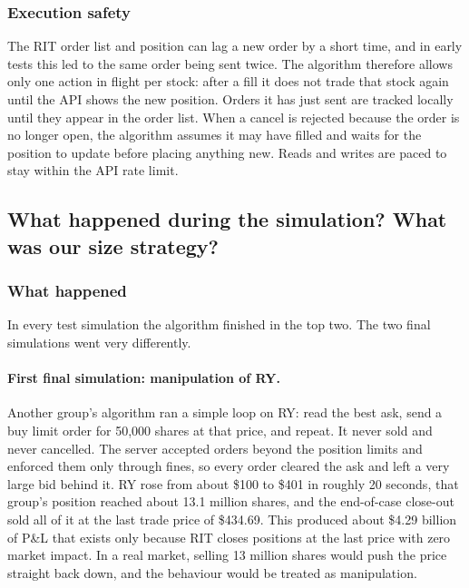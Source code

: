 \documentclass{article}
\begin{document}
\subsubsection*{Execution safety}

The RIT order list and position can lag a new order by a short time, and in early tests this led to the same order being sent twice. The algorithm therefore allows only one action in flight per stock: after a fill it does not trade that stock again until the API shows the new position. Orders it has just sent are tracked locally until they appear in the order list. When a cancel is rejected because the order is no longer open, the algorithm assumes it may have filled and waits for the position to update before placing anything new. Reads and writes are paced to stay within the API rate limit.

\subsection{What happened during the simulation? What was our size strategy?}

\subsubsection*{What happened}

In every test simulation the algorithm finished in the top two. The two final simulations went very differently.

\paragraph{First final simulation: manipulation of RY.}
Another group's algorithm ran a simple loop on RY: read the best ask, send a buy limit order for 50{,}000 shares at that price, and repeat. It never sold and never cancelled. The server accepted orders beyond the position limits and enforced them only through fines, so every order cleared the ask and left a very large bid behind it. RY rose from about \$100 to \$401 in roughly 20 seconds, that group's position reached about 13.1 million shares, and the end-of-case close-out sold all of it at the last trade price of \$434.69. This produced about \$4.29 billion of P\&L that exists only because RIT closes positions at the last price with zero market impact. In a real market, selling 13 million shares would push the price straight back down, and the behaviour would be treated as manipulation.\\
\end{document}
